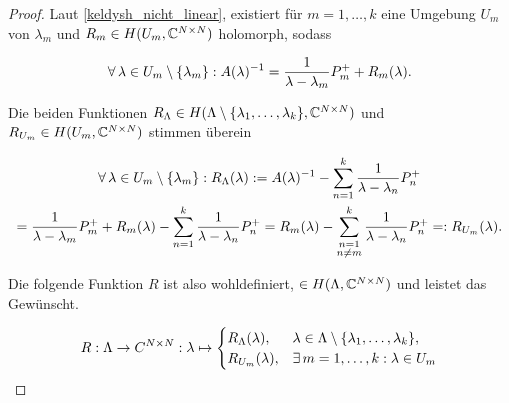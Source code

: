 \begin{proof}

    Laut \ref{keldysh_nicht_linear}, existiert für $m = 1, \dots, k$ eine Umgebung $U_m$ von $\lambda_m$ und $R_m \in H(U_m, \mathbb{C}^{N \times N})$ holomorph, sodass

    \begin{align*}
        \forall \, \lambda \in U_m \setminus {\left \{ \lambda_m \right \}}:
            A(\lambda)^{-1}
            =
            \frac{1}{\lambda - \lambda_m} P_m^+
            +
            R_m(\lambda).
    \end{align*}

    Die beiden Funktionen $R_\Lambda \in H(\Lambda \setminus {\left \{ \lambda_1, \dots, \lambda_k \right \}}, \mathbb{C}^{N \times N})$ und $R_{U_m} \in H(U_m, \mathbb{C}^{N \times N})$ stimmen überein

    \begin{multline*}
        \forall \, \lambda \in U_m \setminus {\left \{ \lambda_m \right \}}:
            R_\Lambda(\lambda)
            :=
            A(\lambda)^{-1}
            -
            \sum_{n=1}^k
                \frac{1}{\lambda - \lambda_n} P_n^+ \\
            =
            \frac{1}{\lambda - \lambda_m} P_m^+
            +
            R_m(\lambda)
            -
            \sum_{n=1}^k
                \frac{1}{\lambda - \lambda_n} P_n^+
            =
            R_m(\lambda)
            -
            \sum_{\substack{n = 1 \\ n \neq m}}^k
                \frac{1}{\lambda - \lambda_n} P_n^+
            =:
            R_{U_m}(\lambda).
    \end{multline*}

    Die folgende Funktion $R$ ist also wohldefiniert, $\in H(\Lambda, \mathbb{C}^{N \times N})$ und leistet das Gewünscht.

    \begin{align*}
        R:
        \Lambda \to C^{N \times N}:
        \lambda
        \mapsto
        \begin{cases}
            R_\Lambda(\lambda), & \lambda \in \Lambda \setminus {\left \{ \lambda_1, \dots, \lambda_k \right \}}, \\
            R_{U_m}(\lambda),   & \exists \, m = 1, \dots, k: \lambda \in U_m
        \end{cases}
    \end{align*}

\end{proof}
